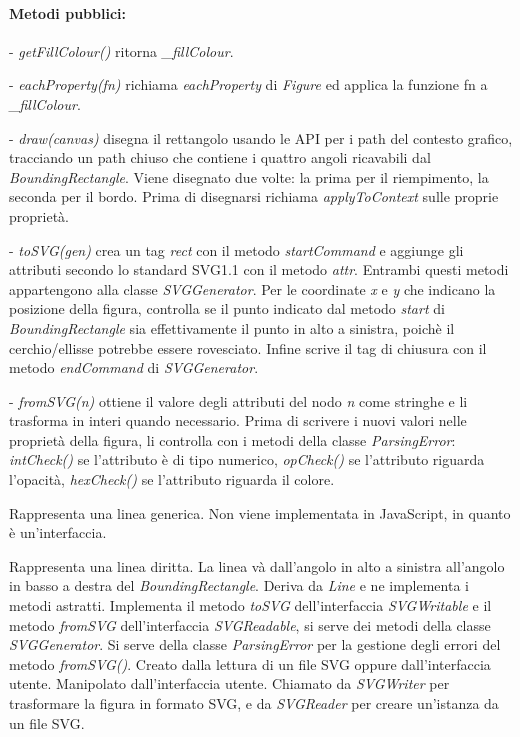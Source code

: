 \paragraph{Metodi pubblici:}
\begin{elencopuntato}[\subsubsecindent]
\item[-] \textit{getFillColour()} ritorna \textit{{\_}fillColour}.
\item[-] \textit{eachProperty(fn)} richiama \textit{eachProperty} di \textit{Figure} ed applica la funzione fn a \textit{{\_}fillColour}.
\item[-] \textit{draw(canvas)} disegna il rettangolo usando le API per i path del contesto grafico, tracciando un path chiuso che contiene i quattro angoli ricavabili dal \textit{BoundingRectangle}. Viene disegnato due volte: la prima per il riempimento, la seconda per il bordo. Prima di disegnarsi richiama \textit{applyToContext} sulle proprie propriet\`a.
\item[-] \textit{toSVG(gen)} crea un tag \textit{rect} con il metodo \textit{startCommand} e aggiunge gli attributi secondo lo standard SVG1.1 con il metodo \textit{attr}. Entrambi questi metodi appartengono alla classe \textit{SVGGenerator}. Per le coordinate \textit{x} e \textit{y} che indicano la posizione della figura, controlla se il punto indicato dal metodo \textit{start} di \textit{BoundingRectangle} sia effettivamente il punto in alto a sinistra, poich\`e il cerchio/ellisse potrebbe essere rovesciato. Infine scrive il tag di chiusura con il metodo \textit{endCommand} di \textit{SVGGenerator}.
\item[-] \textit{fromSVG(n)} ottiene il valore degli attributi del nodo \textit{n} come stringhe e li trasforma in interi quando necessario. Prima di scrivere i nuovi valori nelle propriet\`a della figura, li controlla con i metodi della classe \textit{ParsingError}: \textit{intCheck()} se l'attributo \`e di tipo numerico, \textit{opCheck()} se l'attributo riguarda l'opacit\`a, \textit{hexCheck()} se l'attributo riguarda il colore.
\end{elencopuntato}

Rappresenta una linea generica. Non viene implementata in JavaScript, in quanto \`e un'interfaccia.

Rappresenta una linea diritta. La linea v\`a dall'angolo in alto a sinistra all'angolo in basso a destra del \textit{BoundingRectangle}.
Deriva da \textit{Line} e ne implementa i metodi astratti. Implementa il metodo \textit{toSVG} dell'interfaccia \textit{SVGWritable} e il metodo \textit{fromSVG} dell'interfaccia \textit{SVGReadable}, si serve dei metodi della classe \textit{SVGGenerator}. Si serve della classe \textit{ParsingError} per la gestione degli errori del metodo \textit{fromSVG()}.
Creato dalla lettura di un file SVG oppure dall'interfaccia utente. Manipolato dall'interfaccia utente. Chiamato da \textit{SVGWriter} per trasformare la figura in formato SVG, e da \textit{SVGReader} per creare un'istanza da un file SVG.
